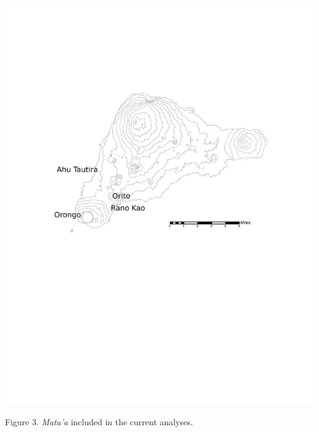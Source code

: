 \documentclass[]{article}
\begin{document}
\includegraphics{../Figures/Figure2.pdf}

 Figure 3. \emph{Mata'a} included in the current analyses.
\end{document}
